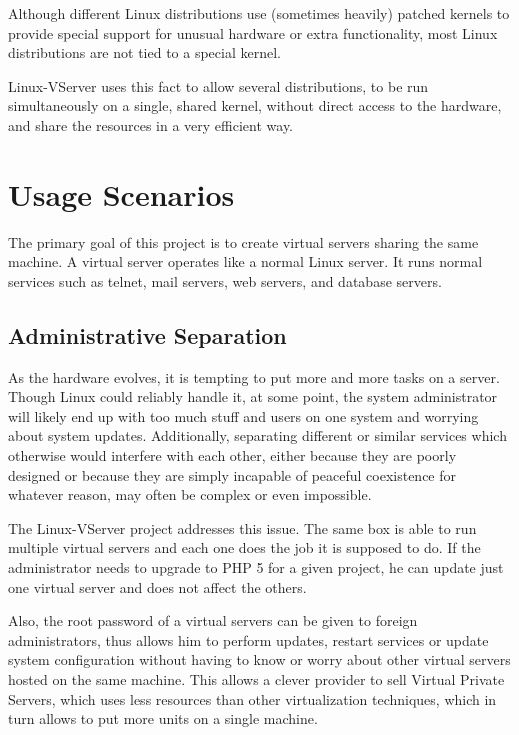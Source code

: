 Although different Linux distributions use (sometimes heavily) patched kernels
to provide special support for unusual hardware or extra functionality, most
Linux distributions are not tied to a special kernel.

Linux-VServer uses this fact to allow several distributions, to be run
simultaneously on a single, shared kernel, without direct access to the
hardware, and share the resources in a very efficient way.


\section{Usage Scenarios}
\label{sec:intro:vserver:usage}

The primary goal of this project is to create virtual servers sharing the same
machine. A virtual server operates like a normal Linux server. It runs normal
services such as telnet, mail servers, web servers, and database servers.


\subsection{Administrative Separation}

As the hardware evolves, it is tempting to put more and more tasks on a server.
Though Linux could reliably handle it, at some point, the system administrator
will likely end up with too much stuff and users on one system and worrying
about system updates. Additionally, separating different or similar services
which otherwise would interfere with each other, either because they are poorly
designed or because they are simply incapable of peaceful coexistence for
whatever reason, may often be complex or even impossible.

The Linux-VServer project addresses this issue. The same box is able to run
multiple virtual servers and each one does the job it is supposed to do. If the
administrator needs to upgrade to PHP 5 for a given project, he can update just
one virtual server and does not affect the others.

Also, the root password of a virtual servers can be given to foreign
administrators, thus allows him to perform updates, restart services or update
system configuration without having to know or worry about other virtual
servers hosted on the same machine. This allows a clever provider to sell
Virtual Private Servers, which uses less resources than other virtualization
techniques, which in turn allows to put more units on a single machine.

